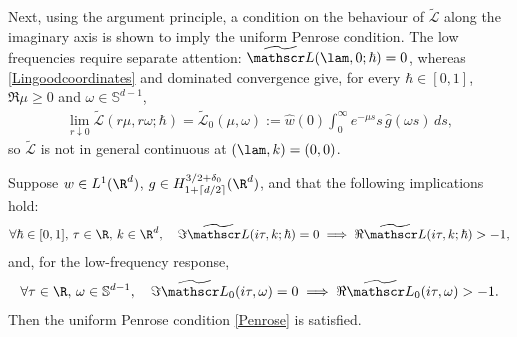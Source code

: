 Next, using the argument principle, a condition on the behaviour of \( \widetilde{\mathscr L} \) along the imaginary axis is shown to imply the uniform Penrose condition. The low frequencies require separate attention: \( \widetilde{\mathscr L}(\lam,0;\hbar)=0 \), whereas \eqref{Lingoodcoordinates} and dominated convergence give, for every $\hbar\in[0,1]$, $\Re\mu\geq0$ and $\omega\in\mathbb S^{d-1}$,\vspace*{-3pt}
\begin{align*}
\lim_{r\downarrow0}\widetilde{\mathscr L}(r\mu,r\omega;\hbar)=\widetilde{\mathscr L}_0(\mu,\omega):=\widehat w(0)\int_0^\infty e^{-\mu s}s\,\widehat g(\omega s)\,ds,
\end{align*}
so \( \widetilde{\mathscr L} \) is not in general continuous at $(\lam,k)=(0,0)$.

\begin{lemma}\label{argumentprinciplelemma}
Suppose \( w \in L^1(\R^d) \), \( g \in H^{3/2+\delta_0}_{1+\lceil d/2 \rceil}(\R^d) \), and that the following implications hold:\begin{align}
\label{impliesPenrose}\forall\hbar\in[0,1],\,\tau\in\R,\,k\in\R^d,\quad \Im\widetilde {\mathscr L}(i\tau,k;\hbar)=0\implies \Re\widetilde {\mathscr L}(i\tau,k;\hbar)>-1,
\end{align}and, for the low-frequency response,
\begin{align}
\label{impliesPenrose0}\forall\tau\in\R,\,\omega\in\mathbb S^{d-1},\quad \Im\widetilde {\mathscr L}_0(i\tau,\omega)=0\implies \Re\widetilde {\mathscr L}_0(i\tau,\omega)>-1.
\end{align} Then the uniform Penrose condition \eqref{Penrose} is satisfied.
\end{lemma}
